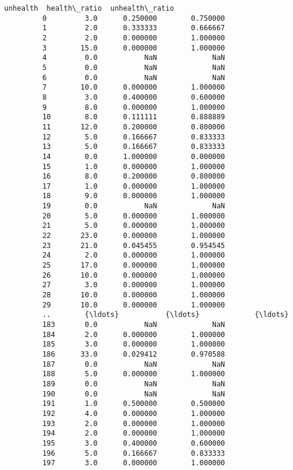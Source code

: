 \documentclass[11pt]{article}
\begin{document}
\begin{Verbatim}[commandchars=\\\{\}]
              unhealth  health\_ratio  unhealth\_ratio  
         0         3.0      0.250000        0.750000  
         1         2.0      0.333333        0.666667  
         2         2.0      0.000000        1.000000  
         3        15.0      0.000000        1.000000  
         4         0.0           NaN             NaN  
         5         0.0           NaN             NaN  
         6         0.0           NaN             NaN  
         7        10.0      0.000000        1.000000  
         8         3.0      0.400000        0.600000  
         9         8.0      0.000000        1.000000  
         10        8.0      0.111111        0.888889  
         11       12.0      0.200000        0.800000  
         12        5.0      0.166667        0.833333  
         13        5.0      0.166667        0.833333  
         14        0.0      1.000000        0.000000  
         15        1.0      0.000000        1.000000  
         16        8.0      0.200000        0.800000  
         17        1.0      0.000000        1.000000  
         18        9.0      0.000000        1.000000  
         19        0.0           NaN             NaN  
         20        5.0      0.000000        1.000000  
         21        5.0      0.000000        1.000000  
         22       23.0      0.000000        1.000000  
         23       21.0      0.045455        0.954545  
         24        2.0      0.000000        1.000000  
         25       17.0      0.000000        1.000000  
         26       10.0      0.000000        1.000000  
         27        3.0      0.000000        1.000000  
         28       10.0      0.000000        1.000000  
         29       10.0      0.000000        1.000000  
         ..        {\ldots}           {\ldots}             {\ldots}  
         183       0.0           NaN             NaN  
         184       2.0      0.000000        1.000000  
         185       3.0      0.000000        1.000000  
         186      33.0      0.029412        0.970588  
         187       0.0           NaN             NaN  
         188       5.0      0.000000        1.000000  
         189       0.0           NaN             NaN  
         190       0.0           NaN             NaN  
         191       1.0      0.500000        0.500000  
         192       4.0      0.000000        1.000000  
         193       2.0      0.000000        1.000000  
         194       2.0      0.000000        1.000000  
         195       3.0      0.400000        0.600000  
         196       5.0      0.166667        0.833333  
         197       3.0      0.000000        1.000000  

\end{Verbatim}
\end{document}
